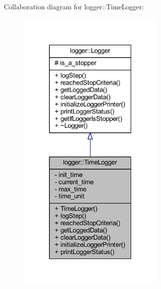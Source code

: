 Collaboration diagram for logger\+:\+:Time\+Logger\+:
\nopagebreak
\begin{figure}[H]
\begin{center}
\leavevmode
\includegraphics[width=205pt]{classlogger_1_1_time_logger__coll__graph}
\end{center}
\end{figure}
